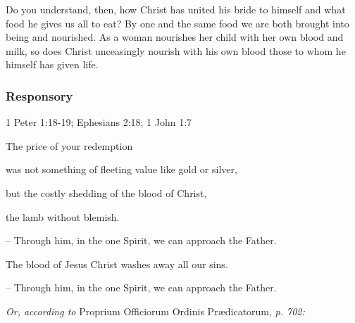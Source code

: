 Do you understand, then, how Christ has united his bride to himself and what food he gives us all to eat? By one and the same food we are both brought into being and nourished. As a woman nourishes her child with her own blood and milk, so does Christ unceasingly nourish with his own blood those to whom he himself has given life.

\subsubsection{Responsory}

\hfill 1 Peter 1:18-19; Ephesians 2:18; 1 John 1:7

\noindent The price of your redemption\par
\noindent was not something of fleeting value like gold or silver,\par
\noindent but the costly shedding of the blood of Christ,\par
\noindent the lamb without blemish.\par
\noindent – Through him, in the one Spirit, we can approach the Father.\par
\vspace{5pt}
\noindent The blood of Jesus Christ washes away all our sins.\par
\noindent – Through him, in the one Spirit, we can approach the Father.

\vspace{5pt}
\textit{Or, according to} Proprium Officiorum Ordinis Prædicatorum, \textit{p. 702:}
